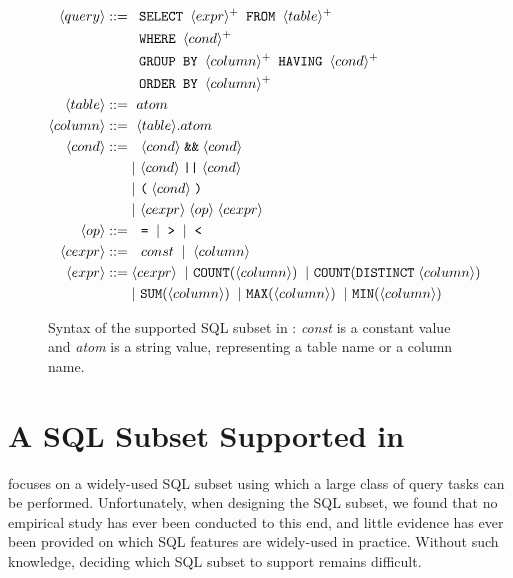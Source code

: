 \begin{figure}[t]
\footnotesize%
\begin{align*}
\q ::= {} 
	& \texttt{ SELECT } \e^+ \texttt{ FROM } \dbtable^+ \\
        & \texttt{ WHERE } \cond^+ \\ 
	&  \texttt{ GROUP BY } \column^+ \texttt{ HAVING } \cond^+\\
	&  \texttt{ ORDER BY } \column^+ \\
\dbtable::= {} &\ atom \\
\column ::= {} &\ \dbtable.atom\\
\cond ::= {} &\ \ \cond \;\texttt{\&\&}\; \cond \\ 
    & |\ \cond \;\texttt{||}\; \cond \\
    & |\ \texttt{(}\;\cond\;\texttt{)} \\
    & |\ \ce \;\op\; \ce \\
\op ::= {} &\ \ \texttt{=} \;\;|\;\; \texttt{>}  \;\;|\;\; \texttt{<}\\
\ce ::= {} &\ \ const \;\;|\;\; \column  \;\; \\
\e ::= {} & \ce \;\;|\ \texttt{COUNT}(\column) \;\;|\ \texttt{COUNT}(\texttt{DISTINCT}\;\column)\\
    & |\ \texttt{SUM}(\column) \;\;|\ \texttt{MAX}(\column) \;\;|\ \texttt{MIN}(\column) 
\end{align*}
\normalsize%
\caption{Syntax of the supported SQL subset in \ourtool:
\textit{const} is a constant value and
\textit{atom} is a string value, representing
a table name or a column name.
}
\label{fig:syntax}
\vspace{-.5mm}
\end{figure}


\section{A SQL Subset Supported in \ourtool}
\label{sec:langsubset}

\vspace{-1mm}

\ourtool focuses on a widely-used SQL subset
using which a large class of query tasks can be performed.
Unfortunately, when designing the SQL
subset, we found that no empirical
study has ever been conducted to this end,
and little evidence has ever been provided
on which SQL features are widely-used in practice.
Without such knowledge, deciding which
SQL subset to support remains difficult.


